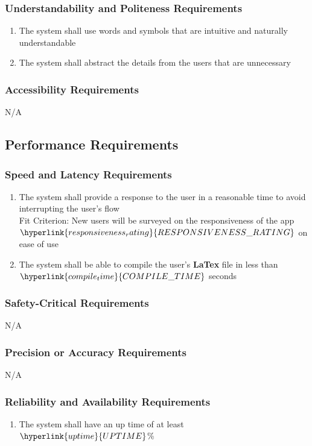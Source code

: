 \documentclass[12pt, titlepage]{article}
\begin{document}
	\subsubsection{Understandability and Politeness Requirements}
	\begin{enumerate}[resume*]
		\item The system shall use words and symbols that are intuitive and naturally understandable
		\item The system shall abstract the details from the users that are unnecessary
	\end{enumerate}
	\subsubsection{Accessibility Requirements}
	N/A
	\subsection{Performance Requirements}
	\subsubsection{Speed and Latency Requirements}
	\begin{enumerate}[resume*]
		\item The system shall provide a response to the user in a reasonable time to avoid interrupting the user's flow\\
		{\color{red}Fit Criterion: New users will be surveyed on the responsiveness of the app $\hyperlink{responsiveness_rating}{RESPONSIVENESS\_RATING}$ on ease of use}
		\item The system shall be able to compile the user's \textbf{LaTex} file in less than $\hyperlink{compile_time}{COMPILE\_TIME}$ seconds\\
	\end{enumerate}
	\subsubsection{Safety-Critical Requirements}
	N/A
	\subsubsection{Precision or Accuracy Requirements}
	N/A
	\subsubsection{Reliability and Availability Requirements}
	\begin{enumerate}[resume*]
		\item The system shall have an up time of at least $\hyperlink{uptime}{UPTIME}$\%
	\end{enumerate}
\end{document}
